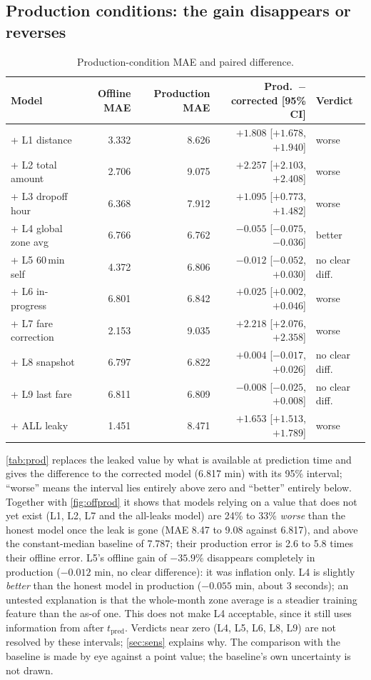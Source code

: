 \documentclass[11pt,a4paper]{article}
\newcommand{\tpred}{$t_{\mathrm{pred}}$}
\begin{document}
\subsection{Production conditions: the gain disappears or reverses}\label{sec:prod}
\begin{table}[H]
\centering\small
\caption{Production-condition MAE and paired difference.}
\label{tab:prod}
\begin{tabular}{@{}l r r r l@{}}
\toprule
Model & Offline MAE & Production MAE & Prod.\ $-$ corrected [95\% CI] & Verdict \\
\midrule
+ L1 distance & 3.332 & 8.626 & $+1.808$ [$+1.678$, $+1.940$] & worse \\
+ L2 total amount & 2.706 & 9.075 & $+2.257$ [$+2.103$, $+2.408$] & worse \\
+ L3 dropoff hour & 6.368 & 7.912 & $+1.095$ [$+0.773$, $+1.482$] & worse \\
+ L4 global zone avg & 6.766 & 6.762 & $-0.055$ [$-0.075$, $-0.036$] & better \\
+ L5 60\,min self & 4.372 & 6.806 & $-0.012$ [$-0.052$, $+0.030$] & no clear diff. \\
+ L6 in-progress & 6.801 & 6.842 & $+0.025$ [$+0.002$, $+0.046$] & worse \\
+ L7 fare correction & 2.153 & 9.035 & $+2.218$ [$+2.076$, $+2.358$] & worse \\
+ L8 snapshot & 6.797 & 6.822 & $+0.004$ [$-0.017$, $+0.026$] & no clear diff. \\
+ L9 last fare & 6.811 & 6.809 & $-0.008$ [$-0.025$, $+0.008$] & no clear diff. \\
+ ALL leaky & 1.451 & 8.471 & $+1.653$ [$+1.513$, $+1.789$] & worse \\
\bottomrule
\end{tabular}
\end{table}

\autoref{tab:prod} replaces the leaked value by what is available at prediction time and gives the difference to the corrected model (6.817 min) with its 95\% interval; ``worse'' means the interval lies entirely above zero and ``better'' entirely below. Together with \autoref{fig:offprod} it shows that models relying on a value that does not yet exist (L1, L2, L7 and the all-leaks model) are 24\% to 33\% \emph{worse} than the honest model once the leak is gone (MAE 8.47 to 9.08 against 6.817), and above the constant-median baseline of 7.787; their production error is 2.6 to 5.8 times their offline error. L5's offline gain of $-35.9\%$ disappears completely in production ($-0.012$ min, no clear difference): it was inflation only. L4 is slightly \emph{better} than the honest model in production ($-0.055$ min, about 3 seconds); an untested explanation is that the whole-month zone average is a steadier training feature than the as-of one. This does not make L4 acceptable, since it still uses information from after \tpred{}. Verdicts near zero (L4, L5, L6, L8, L9) are not resolved by these intervals; \autoref{sec:sens} explains why. The comparison with the baseline is made by eye against a point value; the baseline's own uncertainty is not drawn.
\end{document}
